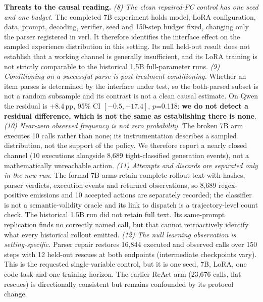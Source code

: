 \textbf{Threats to the causal reading.}
\emph{(8) The clean repaired-FC control has one seed and one budget.} The completed 7B experiment
holds model, LoRA configuration, data, prompt, decoding, verifier, seed and 150-step budget fixed,
changing only the parser registered in verl. It therefore identifies the interface effect on the
sampled experience distribution in this setting. Its null held-out result does not establish that
a working channel is generally insufficient, and its LoRA training is not strictly comparable to
the historical 1.5B full-parameter runs.
\emph{(9) Conditioning on a successful parse is post-treatment conditioning.} Whether an item
parses is determined by the interface under test, so the both-parsed subset is not a random
subsample and its contrast is not a clean causal estimate. On Qwen the residual is $+8.4$\,pp,
95\% CI $[-0.5,+17.4]$, $p$=0.118: \textbf{we do not detect a residual difference, which is not
the same as establishing there is none}.
\emph{(10) Near-zero observed frequency is not zero probability.} The broken 7B arm executes 10
calls rather than none; its instrumentation describes a sampled distribution, not the support of
the policy. We therefore report a nearly closed channel (10 executions alongside 8{,}689 tight-classified
generation events), not a mathematically unreachable action.
\emph{(11) Attempts and discards are separated only in the new run.} The formal 7B arms retain
complete rollout text with hashes, parser verdicts, execution events and returned observations, so
8{,}689 regex-positive emissions and 10 accepted actions are separately recorded; the classifier
is not a semantic-validity oracle and its link to dispatch is a trajectory-level count check. The historical 1.5B
run did not retain full text. Its same-prompt replication finds no correctly named call, but that
cannot retroactively identify what every historical rollout emitted.
\emph{(12) The null learning observation is setting-specific.} Parser repair restores 16{,}844 executed
and observed calls over 150 steps with 12 held-out rescues at both endpoints (intermediate checkpoints vary). This is the requested
single-variable control, but it is one seed, 7B, LoRA, one code task and one training horizon.
The earlier ReAct arm (23{,}676 calls, flat rescues) is directionally consistent but remains
confounded by its protocol change.

